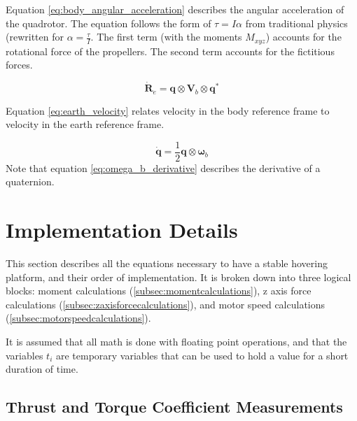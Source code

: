 \documentclass{article}
\numberwithin{equation}{section} %
\begin{document}
Equation \eqref{eq:body_angular_acceleration} describes the angular acceleration of the quadrotor. The equation follows the form of $\tau = I \alpha$ from traditional physics (rewritten for $\alpha = \frac{\tau}{I}$. The first term (with the moments $M_{xyz}$) accounts for the rotational force of the propellers. The second term accounts for the fictitious forces.

\begin{equation} \label{eq:earth_velocity}
\dot{\boldsymbol{R}}_e = \boldsymbol{q} \otimes \boldsymbol{V}_b \otimes \boldsymbol{q}^*
\end{equation}

Equation \eqref{eq:earth_velocity} relates velocity in the body reference frame to velocity in the earth reference frame.




\begin{equation} \label{eq:omega_b_derivative}
\dot{\boldsymbol{q}} = \frac{1}{2} \boldsymbol{q} \otimes \boldsymbol{\omega}_b
\end{equation}
Note that equation \eqref{eq:omega_b_derivative} describes the derivative of a quaternion.


\section{Implementation Details}
This section describes all the equations necessary to have a stable hovering platform, and their order of implementation. It is broken down into three logical blocks: moment calculations (\ref{subsec:momentcalculations}), z axis force calculations (\ref{subsec:zaxisforcecalculations}), and motor speed calculations (\ref{subsec:motorspeedcalculations}). 

It is assumed that all math is done with floating point operations, and that the variables $t_i$ are temporary variables that can be used to hold a value for a short duration of time.


\subsection{Thrust and Torque Coefficient Measurements} \label{subsec:thrustandtorquecoefficientmeasurements}
\end{document}
